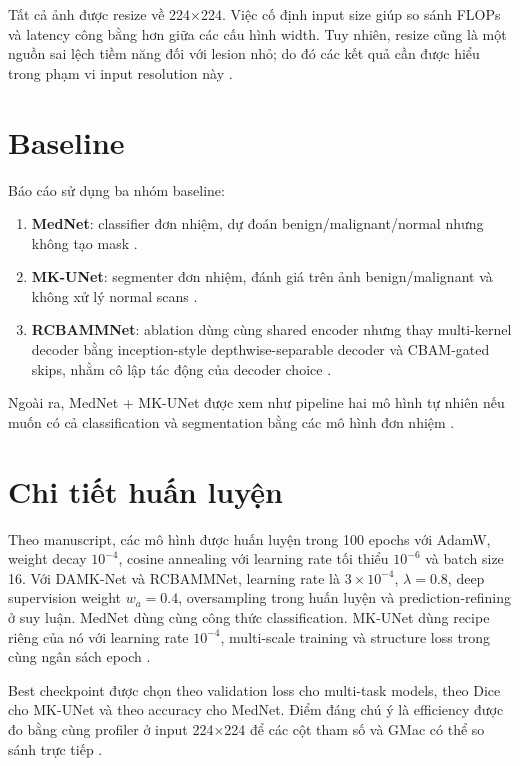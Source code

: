 \documentclass[12pt,a4paper,oneside]{report}
\newcommand{\modelname}{DAMK-Net}
\begin{document}
Tất cả ảnh được resize về 224$\times$224. Việc cố định input size giúp so sánh FLOPs và latency công bằng hơn giữa các cấu hình width. Tuy nhiên, resize cũng là một nguồn sai lệch tiềm năng đối với lesion nhỏ; do đó các kết quả cần được hiểu trong phạm vi input resolution này \citep{damknet}.

\section{Baseline}

Báo cáo sử dụng ba nhóm baseline:

\begin{enumerate}
  \item \textbf{MedNet}: classifier đơn nhiệm, dự đoán benign/malignant/normal nhưng không tạo mask \citep{mednet}.
  \item \textbf{MK-UNet}: segmenter đơn nhiệm, đánh giá trên ảnh benign/malignant và không xử lý normal scans \citep{mkunet}.
  \item \textbf{RCBAMMNet}: ablation dùng cùng shared encoder nhưng thay multi-kernel decoder bằng inception-style depthwise-separable decoder và CBAM-gated skips, nhằm cô lập tác động của decoder choice \citep{cbam,damknet}.
\end{enumerate}

Ngoài ra, MedNet + MK-UNet được xem như pipeline hai mô hình tự nhiên nếu muốn có cả classification và segmentation bằng các mô hình đơn nhiệm \citep{mednet,mkunet,damknet}.

\section{Chi tiết huấn luyện}

Theo manuscript, các mô hình được huấn luyện trong 100 epochs với AdamW, weight decay $10^{-4}$, cosine annealing với learning rate tối thiểu $10^{-6}$ và batch size 16. Với \modelname{} và RCBAMMNet, learning rate là $3\times10^{-4}$, $\lambda=0.8$, deep supervision weight $w_a=0.4$, oversampling trong huấn luyện và prediction-refining ở suy luận. MedNet dùng cùng công thức classification. MK-UNet dùng recipe riêng của nó với learning rate $10^{-4}$, multi-scale training và structure loss trong cùng ngân sách epoch \citep{mednet,mkunet,damknet}.

Best checkpoint được chọn theo validation loss cho multi-task models, theo Dice cho MK-UNet và theo accuracy cho MedNet. Điểm đáng chú ý là efficiency được đo bằng cùng profiler ở input 224$\times$224 để các cột tham số và GMac có thể so sánh trực tiếp \citep{damknet}.
\end{document}
